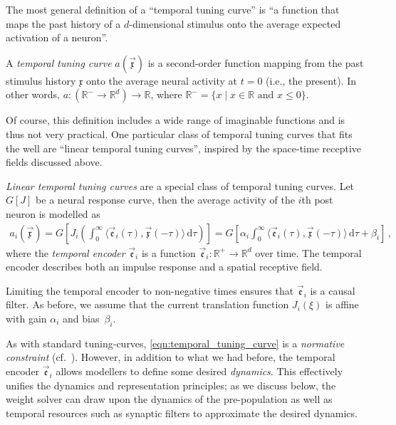 The most general definition of a \enquote{temporal tuning curve} is \enquote{a function that maps the past history of a $d$-dimensional stimulus onto the average expected activation of a neuron}.

\begin{definition}
	\label{def:temporal_tuning_curve}
	A \emph{temporal tuning curve} $a(\vec{\mathfrak{x}})$ is a second-order function mapping from the past stimulus history $\mathfrak{x}$ onto the average neural activity at $t = 0$ (i.e., the present).
	In other words, $a : (\mathbb{R}^- \longrightarrow \mathbb{R}^d) \longrightarrow \mathbb{R}$, where $\mathbb{R}^- = \{ x \mid x \in \mathbb{R} \text{ and } x \leq 0 \}$.
\end{definition}

Of course, this definition includes a wide range of imaginable functions and is thus not very practical.
One particular class of temporal tuning curves that fits the \NEF well are \enquote{linear temporal tuning curves}, inspired by the space-time receptive fields discussed above.

\begin{definition}
	\label{def:linear_temporal_tuning}
	\emph{Linear temporal tuning curves} are a special class of temporal tuning curves.
	Let $G[J]$ be a neural response curve, then the average activity of the $i$th post neuron is modelled as
	\begin{align}
		a_i(\vec{\mathfrak{x}})
			= G\left[ J_i \left( \int_{0}^\infty \!\!\! \big\langle \vec{\mathfrak{e}}_i(\tau), \vec{\mathfrak{x}}(-\tau) \big\rangle 	\,\mathrm{d}\tau \right) \right]
		= G\left[ \alpha_i \! \int_{0}^\infty \!\!\! \big\langle \vec{\mathfrak{e}}_i(\tau), \vec{\mathfrak{x}}(-\tau) \big\rangle \,\mathrm{d}\tau + \beta_i \right] \,,
		\label{eqn:temporal_tuning_curve}
	\end{align}
	where the \emph{temporal encoder} $\vec{\mathfrak{e}}_i$ is a function $\vec{\mathfrak{e}}_i : \mathbb{R}^+ \longrightarrow \mathbb{R}^d$ over time. The temporal encoder describes both an impulse response and a spatial receptive field.
\end{definition}
\noindent Limiting the temporal encoder to non-negative times ensures that $\vec{\mathfrak{e}}_i$ is a causal filter.
As before, we assume that the current translation function $J_i(\xi)$ is affine with gain $\alpha_i$ and bias~$\beta_i$.

As with standard tuning-curves, \cref{eqn:temporal_tuning_curve} is a \emph{normative constraint} (cf.~).
However, in addition to what we had before, the temporal encoder $\vec{\mathfrak{e}}_i$ allows modellers to define some desired \emph{dynamics}.
This effectively unifies the \NEF dynamics and representation principles; as we discuss below, the weight solver can draw upon the dynamics of the pre-population as well as temporal resources such as synaptic filters to approximate the desired dynamics.

